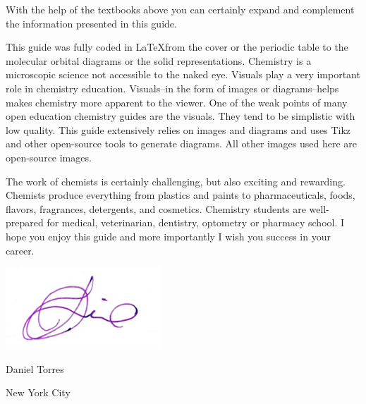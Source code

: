 \documentclass[main.tex]{subfiles}
\begin{document}
\begin{fullwidth}
\begin{multicols*}{2}
With the help of the textbooks above you can certainly expand and complement the information presented in this guide.

This guide was fully coded in \LaTeX from the cover or the periodic table to the molecular orbital diagrams or the solid representations. Chemistry is a microscopic science not accessible to the naked eye. Visuals play a very important role in chemistry education. Visuals--in the form of images or diagrams--helps makes chemistry more apparent to the viewer. One of the weak points of many open education chemistry guides are the visuals. They tend to be simplistic with low quality. This guide extensively relies on images and diagrams and uses Tikz and other open-source tools to generate diagrams. All other images used here are open-source images.

The work of chemists is certainly challenging, but also exciting and rewarding. Chemists produce everything from plastics and paints to pharmaceuticals, foods, flavors, fragrances, detergents, and cosmetics. Chemistry students are well-prepared for medical, veterinarian, dentistry, optometry or pharmacy school. I hope you enjoy this guide and more importantly I wish you success in your career.  
\par \medskip
\includegraphics[height=4.5\baselineskip,]{./tothereader/signature} \par
Daniel Torres \par
New York City
\end{multicols*}
\end{fullwidth}
\restoregeometry
\end{document}
